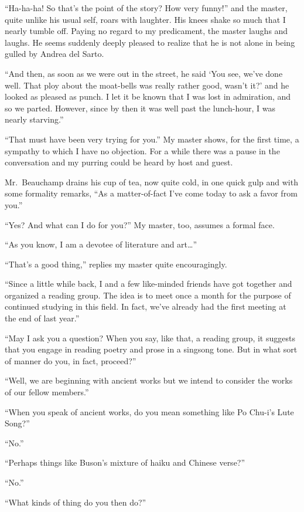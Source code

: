 \documentclass{book}
\begin{document}
``Ha-ha-ha! So that's the point of the story? How very funny!'' and the
master, quite unlike his usual self, roars with laughter. His knees
shake so much that I nearly tumble off. Paying no regard to my
predicament, the master laughs and laughs. He seems suddenly deeply
pleased to realize that he is not alone in being gulled by Andrea del
Sarto.

``And then, as soon as we were out in the street, he said `You see,
we've done well. That ploy about the moat-bells was really rather good,
wasn't it?' and he looked as pleased as punch. I let it be known that I
was lost in admiration, and so we parted. However, since by then it was
well past the lunch-hour, I was nearly starving.''

``That must have been very trying for you.'' My master shows, for the
first time, a sympathy to which I have no objection. For a while there
was a pause in the conversation and my purring could be heard by host
and guest.

Mr.~Beauchamp drains his cup of tea, now quite cold, in one quick gulp
and with some formality remarks, ``As a matter-of-fact I've come today
to ask a favor from you.''

``Yes? And what can I do for you?'' My master, too, assumes a formal
face.

``As you know, I am a devotee of literature and art\ldots{}''

``That's a good thing,'' replies my master quite encouragingly.

``Since a little while back, I and a few like-minded friends have got
together and organized a reading group. The idea is to meet once a month
for the purpose of continued studying in this field. In fact, we've
already had the first meeting at the end of last year.''

``May I ask you a question? When you say, like that, a reading group, it
suggests that you engage in reading poetry and prose in a singsong tone.
But in what sort of manner do you, in fact, proceed?''

``Well, we are beginning with ancient works but we intend to consider
the works of our fellow members.''

``When you speak of ancient works, do you mean something like Po Chu-i's
Lute Song?''

``No.''

``Perhaps things like Buson's mixture of haiku and Chinese verse?''

``No.''

``What kinds of thing do you then do?''
\end{document}
